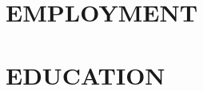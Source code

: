 \documentclass[margin]{res}
\begin{document}
 


\address{
  Kavli IPMU, 5-1-5 Kashiwanoha, Kashiwa City, Chiba 277-8583, Japan, \\
  \href{mailto:leander.thiele@ipmu.jp}{\texttt{leander.thiele@ipmu.jp}},
  \href{https://leanderthiele.github.io}{\texttt{leanderthiele.github.io}}
}

\begin{resume} 



\section{EMPLOYMENT}


\section{EDUCATION}



\end{resume}
\end{document}
